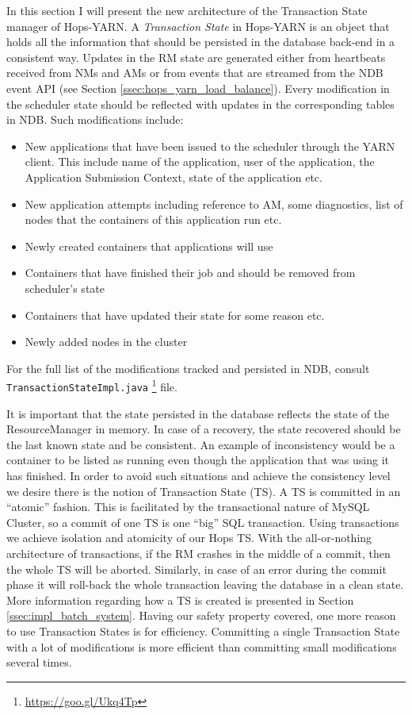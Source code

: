 In this section I will present the new architecture of the Transaction
State manager of Hops-YARN. A \emph{Transaction State} in Hops-YARN is
an object that holds all the information that should be persisted in
the database back-end in a consistent way. Updates in the RM state are
generated either from heartbeats received from NMs and AMs or from
events that are streamed from the NDB event API (see Section
\ref{ssec:hops_yarn_load_balance}). Every modification in the
scheduler state should be reflected with updates in the corresponding
tables in NDB. Such modifications include:
\begin{itemize}
\item New applications that have been issued to the scheduler through
the YARN client. This include name of the application, user of
the application, the Application Submission Context, state of the
application etc.

\item New application attempts including reference to AM, some
diagnostics, list of nodes that the containers of this application run
etc.

\item Newly created containers that applications will use

\item Containers that have finished their job and should be removed
from scheduler's state

\item Containers that have updated their state for some reason etc.

\item Newly added nodes in the cluster
\end{itemize}

For the full list of the modifications tracked and persisted in NDB,
consult \texttt{TransactionStateImpl.java}
\footnote{\url{https://goo.gl/Ukq4Tp}} file.

It is important that the state persisted in the database reflects the
state of the ResourceManager in memory. In case of a recovery, the
state recovered should be the last known state and be consistent. An
example of inconsistency would be a container to be listed as running
even though the application that was using it has finished. In order to
avoid such situations and achieve the consistency level we desire
there is the notion of Transaction State (TS). A TS is committed in an
``atomic'' fashion. This is facilitated by the transactional nature of
MySQL Cluster, so a commit of one TS is one ``big'' SQL
transaction. Using transactions we achieve isolation and atomicity of
our Hops TS. With the all-or-nothing architecture of transactions, if
the RM crashes in the middle of a commit, then the whole TS will be
aborted. Similarly, in case of an error during the commit phase it will
roll-back the whole transaction leaving the database in a clean state.
More information regarding how a TS is created is presented in Section
\ref{ssec:impl_batch_system}. Having our safety property covered, one
more reason to use Transaction States is for efficiency. Committing a
single Transaction State with a lot of modifications is more efficient
than committing small modifications several times.

